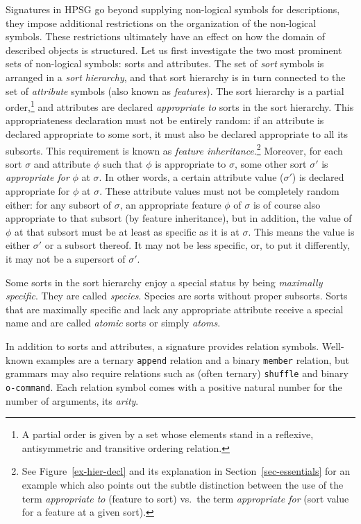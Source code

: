 \documentclass[output=paper
 	        ,biblatex
                ,babelshorthands
                ,newtxmath
                ,draftmode
                ,colorlinks, citecolor=brown
]{langscibook}
\begin{document}
{Signatures in HPSG go beyond supplying non-logical symbols for
descriptions, they impose additional restrictions on the
organization of the non-logical symbols. These restrictions ultimately have an effect on
how the domain of described objects is structured. Let us first
investigate the two most prominent sets of non-logical symbols: sorts
and attributes. The set of \emph{sort} symbols is arranged in a
\emph{sort hierarchy}, and that sort hierarchy is in turn connected to
the set of \emph{attribute} symbols (also known as
\emph{features}). The sort hierarchy is a partial order,\footnote{A partial order is given by a set whose elements stand in a reflexive,
antisymmetric and transitive ordering relation.} and
attributes are declared \emph{appropriate to} sorts
in the sort hierarchy. This appropriateness declaration must not be
entirely random: if an attribute is declared appropriate to some sort,
it must also be declared appropriate to all its subsorts. This requirement
is known as \emph{feature inheritance}.\footnote{See Figure~\ref{ex-hier-decl} and its explanation in Section~\ref{sec-essentials} for an example which also points out the subtle distinction between the use of the term \emph{appropriate to} (feature to sort) vs.\ the term \emph{appropriate for} (sort value for a feature at a given sort).}  Moreover, for each
sort $\sigma$ and attribute $\phi$ such that $\phi$ is appropriate to
$\sigma$, some other sort $\sigma'$ is \emph{appropriate for} $\phi$
at $\sigma$. In other words, a certain attribute value ($\sigma'$) is declared
appropriate for $\phi$ at $\sigma$. These attribute values must not be
completely random either: for any subsort of $\sigma$, an
appropriate feature $\phi$ of $\sigma$ is of course also appropriate
to that subsort (by feature inheritance), but in addition, the value of $\phi$ at that subsort
must be at least as specific as it is at $\sigma$. This means the value is either
$\sigma'$ or a subsort thereof. It may not be less specific, or, to put
it differently, it may not be a
supersort of $\sigma'$.

Some sorts in the sort hierarchy enjoy a special status by being
\emph{maximally specific}. They are called \emph{species}. Species
are sorts without proper subsorts.
Sorts that are maximally specific and lack any appropriate attribute receive
a special name and are called \emph{atomic} sorts or simply \emph{atoms}.

In addition to sorts and attributes, a signature provides relation
symbols.  Well-known examples are a ternary \texttt{append} relation
and a binary \texttt{member} relation, but grammars may also require
relations such as (often ternary) \texttt{shuffle} and binary
\texttt{o-command}. Each relation symbol comes with
a positive natural number for the number of arguments, its \emph{arity}.

}
\end{document}
